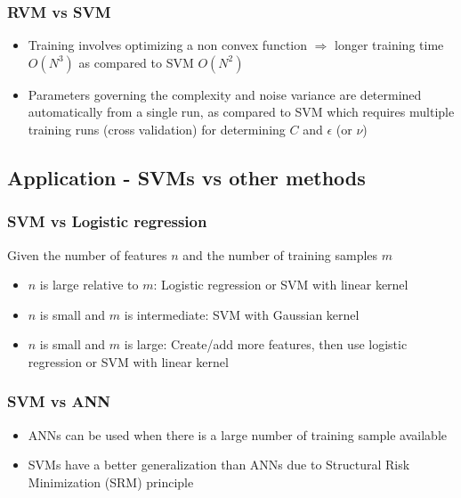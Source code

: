 \documentclass[t,14pt]{beamer}
\begin{document}
\begin{frame}
  \frametitle{RVM vs SVM}
  \begin{itemize}
    \item {
            Training involves optimizing a non convex function 
            $\Rightarrow$ 
            longer training time $O(N^3)$ as compared to SVM $O(N^2)$
          }
    \item {
            Parameters governing the complexity and noise variance are 
            determined automatically from a single run, as compared to SVM 
            which requires multiple training runs (cross validation) for 
            determining $C$ and $\epsilon$ (or $\nu$)
          }
  \end{itemize}
\end{frame}

\subsection{Application - SVMs vs other methods}

\begin{frame}
  \frametitle{SVM vs Logistic regression}
  Given the number of features $n$ and the number of training samples $m$
  \begin{itemize}
    \item {
            $n$ is large relative to $m$: Logistic regression or SVM with linear 
            kernel 
          }
    \item {$n$ is small and $m$ is intermediate: SVM with Gaussian kernel}
    \item {
            $n$ is small and $m$ is large: Create/add more features, then use 
            logistic regression or SVM with linear kernel
          }
  \end{itemize}
\end{frame}

\begin{frame}
  \frametitle{SVM vs ANN}
  \begin{itemize}
    \item { 
            ANNs can be used when there is a large number of training sample 
            available
          }
    \item {
            SVMs have a better generalization than ANNs due to Structural Risk
            Minimization (SRM) principle
          }
  \end{itemize}
\end{frame}
\end{document}
